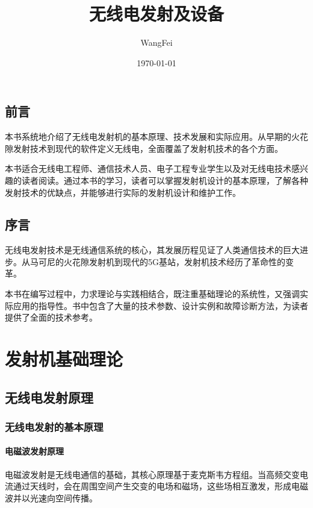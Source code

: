 \documentclass[12pt,UTF8]{ctexbook}
\title{\heiti\zihao{0} 无线电发射及设备}
\author{WangFei}
\date{\today}
\begin{document}
\maketitle
\tableofcontents

\frontmatter
\chapter{前言}

本书系统地介绍了无线电发射机的基本原理、技术发展和实际应用。从早期的火花隙发射技术到现代的软件定义无线电，全面覆盖了发射机技术的各个方面。

本书适合无线电工程师、通信技术人员、电子工程专业学生以及对无线电技术感兴趣的读者阅读。通过本书的学习，读者可以掌握发射机设计的基本原理，了解各种发射技术的优缺点，并能够进行实际的发射机设计和维护工作。

\chapter{序言}

无线电发射技术是无线通信系统的核心，其发展历程见证了人类通信技术的巨大进步。从马可尼的火花隙发射机到现代的5G基站，发射机技术经历了革命性的变革。

本书在编写过程中，力求理论与实践相结合，既注重基础理论的系统性，又强调实际应用的指导性。书中包含了大量的技术参数、设计实例和故障诊断方法，为读者提供了全面的技术参考。

\mainmatter

\part{发射机基础理论}

\chapter{无线电发射原理}

\section{无线电发射的基本原理}

\subsection{电磁波发射原理}

电磁波发射是无线电通信的基础，其核心原理基于麦克斯韦方程组。当高频交变电流通过天线时，会在周围空间产生交变的电场和磁场，这些场相互激发，形成电磁波并以光速向空间传播。
\end{document}
